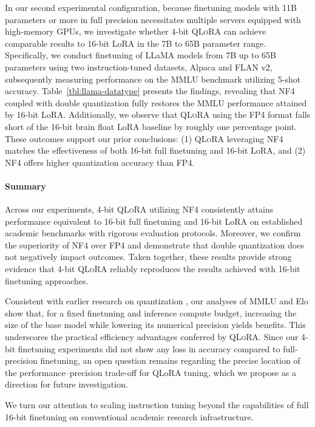 In our second experimental configuration, because finetuning models with 11B parameters or more in full precision necessitates multiple servers equipped with high-memory GPUs, we investigate whether 4-bit \textsc{QLoRA} can achieve comparable results to 16-bit LoRA in the 7B to 65B parameter range. Specifically, we conduct finetuning of LLaMA models from 7B up to 65B parameters using two instruction-tuned datasets, Alpaca and FLAN v2, subsequently measuring performance on the MMLU benchmark utilizing 5-shot accuracy. Table~\ref{tbl:llama-datatype} presents the findings, revealing that NF4 coupled with double quantization fully restores the MMLU performance attained by 16-bit LoRA. Additionally, we observe that \textsc{QLoRA} using the FP4 format falls short of the 16-bit brain float LoRA baseline by roughly one percentage point. These outcomes support our prior conclusions: (1) \textsc{QLoRA} leveraging NF4 matches the effectiveness of both 16-bit full finetuning and 16-bit LoRA, and (2) NF4 offers higher quantization accuracy than FP4.

\paragraph{Summary} Across our experiments, 4-bit \textsc{QLoRA} utilizing NF4 consistently attains performance equivalent to 16-bit full finetuning and 16-bit LoRA on established academic benchmarks with rigorous evaluation protocols. Moreover, we confirm the superiority of NF4 over FP4 and demonstrate that double quantization does not negatively impact outcomes. Taken together, these results provide strong evidence that 4-bit \textsc{QLoRA} reliably reproduces the results achieved with 16-bit finetuning approaches.

Consistent with earlier research on quantization \citep{dettmers2022case}, our analyses of MMLU and Elo show that, for a fixed finetuning and inference compute budget, increasing the size of the base model while lowering its numerical precision yields benefits. This underscores the practical efficiency advantages conferred by \textsc{QLoRA}. Since our 4-bit finetuning experiments did not show any loss in accuracy compared to full-precision finetuning, an open question remains regarding the precise location of the performance–precision trade-off for QLoRA tuning, which we propose as a direction for future investigation.

We turn our attention to scaling instruction tuning beyond the capabilities of full 16-bit finetuning on conventional academic research infrastructure.

